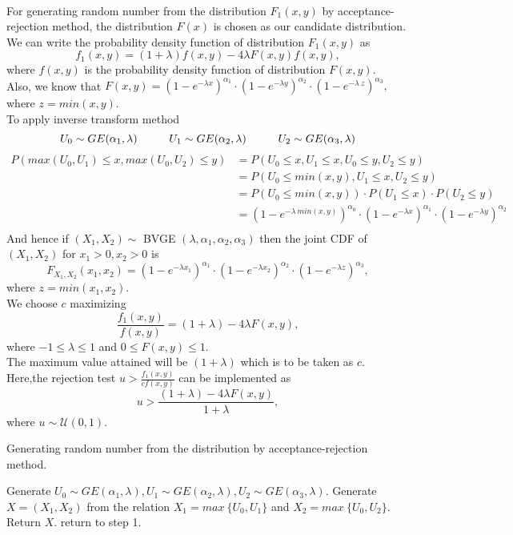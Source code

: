 \documentclass[11pt]{article}
\begin{document}
\begin{enumerate}
\\
For generating random number from the distribution $F_{1}(x,y)$ by acceptance-rejection method, the distribution $F(x)$ is chosen as our candidate distribution.\\
We can write the probability density function of distribution $F_{1}(x,y)$ as
$$f_{1}(x,y) = (1 + \lambda)f(x,y) - 4 \lambda F(x,y) f(x,y),$$
where $f(x,y)$ is the probability density function of distribution $F(x,y)$.\\
Also, we know that $F(x,y) = (1-e^{- \lambda x})^{\alpha_1}\cdot(1-e^{- \lambda y})^{\alpha_2}\cdot(1-e^{- \lambda ~z})^{\alpha_3},$ where $z=min(x,y)$.\\
To apply inverse transform method
$$U_{0} \sim GE(\alpha_{1},\lambda) \hspace{10mm} U_{1} \sim GE(\alpha_{2},\lambda) \hspace{10mm} U_{2} \sim GE(\alpha_{3},\lambda)$$
\begin{equation}
\begin{split}
P(max(U_0,U_1)\leq x,max(U_0,U_2) \leq y) & = P(U_0 \leq x, U_1 \leq x, U_0 \leq y, U_2 \leq y) \\
 & = P(U_0\leq min(x,y),U_1 \leq x,U_2 \leq y) \\
 & = P(U_0\leq min(x,y)) \cdot P(U_1 \leq x) \cdot P(U_2 \leq y) \\
 & = (1-e^{- \lambda ~min(x,y)})^{\alpha_0} \cdot (1-e^{- \lambda x})^{\alpha_1} \cdot (1-e^{- \lambda y})^{\alpha_2} \\
\end{split}\nonumber
\end{equation}
And hence if $(X_1,X_2)\sim$ BVGE $(\lambda,\alpha_1,\alpha_2,\alpha_3)$ then the joint CDF of $(X_1,X_2)$ for $x_1 > 0 , x_2 > 0$ is 
$$F_{X_1,X_2}(x_1,x_2) = (1-e^{- \lambda x_1})^{\alpha_1} \cdot (1-e^{- \lambda x_2})^{\alpha_2} \cdot (1-e^{- \lambda z})^{\alpha_3},$$
where $z=min(x_1,x_2)$.\\
We choose $c$ maximizing $$\frac{f_{1}(x,y)}{f(x,y)} = (1 + \lambda) - 4 \lambda F(x,y),$$ where $-1 \leq \lambda \leq 1$ and $0 \leq F(x,y) \leq 1$.\\
The maximum value attained will be $(1 + \lambda)$ which is to be taken as $c$.\\
Here,the rejection test $u > \frac{f_{1}(x,y)}{cf(x,y)}$ can be implemented as $$u > \frac{(1 + \lambda) - 4 \lambda F(x,y)}{1 + \lambda},$$ where $u \sim \mathcal{U}(0,1)$.

\begin{algorithm}[H]
\caption{Generating random number from the distribution by acceptance-rejection method.}
\begin{algorithmic}[1]
\STATE Generate $U_{0} \sim GE(\alpha_{1},\lambda), U_{1} \sim GE(\alpha_{2},\lambda) , U_{2} \sim GE(\alpha_{3},\lambda)$.
\STATE Generate $X = (X_{1}, X_{2})$ from the relation $X_{1} = max~\{U_0,U_1\}$ and $X_2=max~\{U_0,U_2\}$.
	\STATE Return $X$.
\ELSE
	\STATE return to step 1.
\ENDIF
\end{algorithmic}
\end{algorithm}



\end{enumerate}
\end{document}

